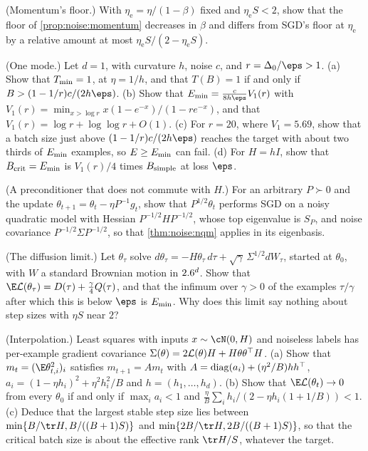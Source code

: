 \begin{refsection}
\begin{exercises}
\item \consolidation (Momentum's floor.) With $\eta_{\mathrm e}=\eta/(1-\beta)$ fixed and $\eta_{\mathrm e}S<2$, show that the floor of \cref{prop:noise:momentum} decreases in $\beta$ and differs from SGD's floor at $\eta_{\mathrm e}$ by a relative amount at most $\eta_{\mathrm e}S/(2-\eta_{\mathrm e}S)$.\label{ex:noise:momfloor}

\item \consolidation (One mode.) Let $d=1$, with curvature $h$, noise $c$, and $r=\Delta_0/\eps>1$. (a) Show that $T_{\min}=1$, at $\eta=1/h$, and that $T(B)=1$ if and only if $B>(1-1/r)c/(2h\eps)$. (b) Show that $\noiseEmin=\frac{c}{8h\eps}V_1(r)$ with $V_1(r)=\min_{x>\log r}x(1-e^{-x})/(1-re^{-x})$, and that $V_1(r)=\log r+\log\log r+O(1)$. (c) For $r=20$, where $V_1=5.69$, show that a batch size just above $(1-1/r)c/(2h\eps)$ reaches the target with about two thirds of $E_{\min}$ examples, so $E\ge E_{\min}$ can fail. (d) For $H=hI$, show that $B_{\mathrm{crit}}=E_{\min}$ is $V_1(r)/4$ times $B_{\mathrm{simple}}$ at loss $\eps$. \label{ex:noise:onemode}

\item \consolidation (A preconditioner that does not commute with $H$.) For an arbitrary $P\succ0$ and the update $\theta_{t+1}=\theta_t-\eta P^{-1}g_t$, show that $P^{1/2}\theta_t$ performs SGD on a noisy quadratic model with Hessian $P^{-1/2}HP^{-1/2}$, whose top eigenvalue is $S_P$, and noise covariance $P^{-1/2}\Sigma P^{-1/2}$, so that \cref{thm:noise:nqm} applies in its eigenbasis.\label{ex:noise:change}

\item \consolidation (The diffusion limit.) Let $\theta_\tau$ solve $d\theta_\tau=-H\theta_\tau\,d\tau+\sqrt\gamma\,\Sigma^{1/2}dW_\tau$, started at $\theta_0$, with $W$ a standard Brownian motion in $2.6^d$. Show that $\E\Loss(\theta_\tau)=D(\tau)+\frac\gamma4Q(\tau)$, and that the infimum over $\gamma>0$ of the examples $\tau/\gamma$ after which this is below $\eps$ is $E_{\min}$. Why does this limit say nothing about step sizes with $\eta S$ near $2$?\label{ex:noise:ou}

\item \variation (Interpolation.) Least squares with inputs $x\sim\cN(0,H)$ and noiseless labels has per-example gradient covariance $\Sigma(\theta)=2\mathcal{L}(\theta)H+H\theta\theta^\top H$. (a) Show that $m_t=(\E\theta_{t,i}^2)_i$ satisfies $m_{t+1}=Am_t$ with $A=\operatorname{diag}(a_i)+(\eta^2/B)hh^\top$, $a_i=(1-\eta h_i)^2+\eta^2h_i^2/B$ and $h=(h_1,\dots,h_d)$. (b) Show that $\E\Loss(\theta_t)\to0$ from every $\theta_0$ if and only if $\max_ia_i<1$ and $\frac\eta B\sum_ih_i/(2-\eta h_i(1+1/B))<1$. (c) Deduce that the largest stable step size lies between $\min\{B/\tr H,B/((B+1)S)\}$ and $\min\{2B/\tr H,2B/((B+1)S)\}$, so that the critical batch size is about the effective rank $\tr H/S$, whatever the target. \label{ex:noise:interp}


\end{exercises}
\end{refsection}
